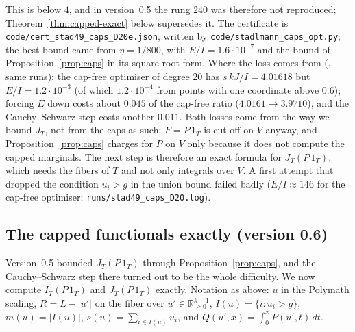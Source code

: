 \begin{sloppypar}
This is below $4$, and in version~0.5 the rung $240$ was therefore not
reproduced; Theorem~\ref{thm:capped-exact} below supersedes it. The certificate is
\texttt{code/cert\_stad49\_caps\_D20e.json}, written by
\texttt{code/stadlmann\_caps\_opt.py}; the best bound came from
$\eta=1/800$, with $E/I=1.6\cdot10^{-7}$ and the bound of
Proposition~\ref{prop:caps} in its square-root form. Where the loss comes from
(, same runs): the cap-free optimiser of degree $20$ has
$s\,kJ/I=4.01618$ but $E/I=1.2\cdot10^{-3}$ (of which $1.2\cdot10^{-4}$ from points with one
coordinate above $0.6$); forcing $E$ down costs about $0.045$ of the cap-free
ratio ($4.0161\to3.9710$), and the Cauchy--Schwarz step costs another
$0.011$. Both losses come from the way we bound $J_T$, not from the caps as
such: $F=P\,1_T$ is cut off on $V$ anyway, and Proposition~\ref{prop:caps}
charges for $P$ on $V$ only because it does not compute the capped marginals.
The next step is therefore an exact formula for $J_T(P\,1_T)$, which needs the
fibers of $T$ and not only integrals over $V$. A first attempt that dropped the
condition $u_i>g$ in the union bound failed badly ($E/I\approx146$ for the
cap-free optimiser; \texttt{runs/stad49\_caps\_D20.log}).
\end{sloppypar}

\subsection*{The capped functionals exactly (version 0.6)}
Version~0.5 bounded $J_T(P\,1_T)$ through Proposition~\ref{prop:caps}, and the
Cauchy--Schwarz step there turned out to be the whole difficulty. We now
compute $I_T(P\,1_T)$ and $J_T(P\,1_T)$ exactly. Notation as above: $u$ in the
Polymath scaling, $R=L-|u'|$ on the fiber over $u'\in\mathbb R_{\ge0}^{k-1}$,
$I(u)=\{i:u_i>g\}$, $m(u)=|I(u)|$, $s(u)=\sum_{i\in I(u)}u_i$, and
$Q(u',x)=\int_0^xP(u',t)\,dt$.

